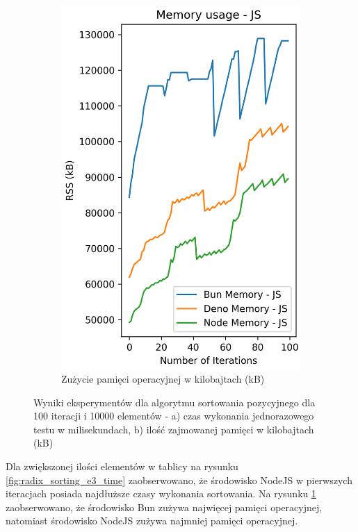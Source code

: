 \begin{figure}[H]
\begin{subfigure}[b]{0.42\textwidth}
  \end{subfigure}
  \begin{subfigure}[b]{0.42\textwidth}
    \centering
    \includegraphics[width=\textwidth]{Figures/sorting/sorting_radix_100_10000_js_memory.png}
    \caption{Zużycie pamięci operacyjnej w kilobajtach (kB)}
    \label{fig:radix_sorting_e3_memory}
  \end{subfigure}
  \caption{Wyniki eksperymentów dla algorytmu sortowania pozycyjnego dla 100 iteracji i 10000 elementów - a) czas wykonania jednorazowego testu w milisekundach, b) ilość zajmowanej pamięci w kilobajtach (kB)}
  \label{fig:radix_sorting_e3}
\end{figure}

Dla zwiększonej ilości elementów w tablicy na rysunku \ref{fig:radix_sorting_e3_time} zaobserwowano, że środowisko NodeJS w pierwszych iteracjach posiada najdłuższe czasy wykonania sortowania. Na rysunku \ref{fig:radix_sorting_e3_memory} zaobserwowano, że środowisko Bun zużywa najwięcej pamięci operacyjnej, natomiast środowisko NodeJS zużywa najmniej pamięci operacyjnej.

